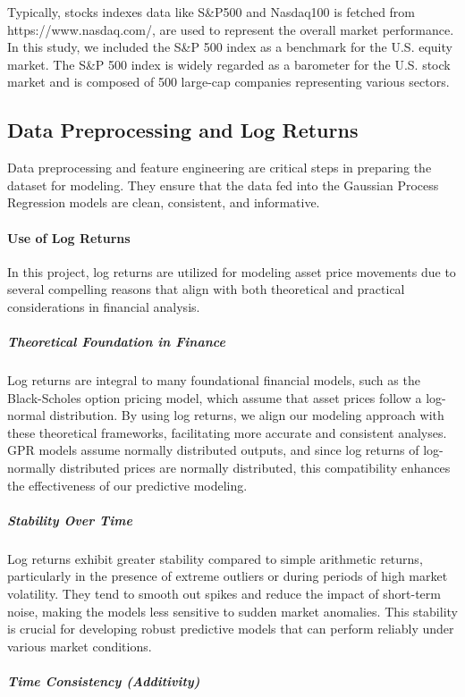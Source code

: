 Typically, stocks indexes data like S\&P500 and Nasdaq100 is fetched from https://www.nasdaq.com/, are used to represent the overall market performance. In this study, we included the S\&P 500 index as a benchmark for the U.S. equity market. The S\&P 500 index is widely regarded as a barometer for the U.S. stock market and is composed of 500 large-cap companies representing various sectors.

\subsection{Data Preprocessing and Log Returns}
Data preprocessing and feature engineering are critical steps in preparing the dataset for modeling. They ensure that the data fed into the Gaussian Process Regression models are clean, consistent, and informative.

\paragraph{Use of Log Returns}

In this project, log returns are utilized for modeling asset price movements due to several compelling reasons that align with both theoretical and practical considerations in financial analysis.

\subparagraph{Theoretical Foundation in Finance}

Log returns are integral to many foundational financial models, such as the Black-Scholes option pricing model, which assume that asset prices follow a log-normal distribution. By using log returns, we align our modeling approach with these theoretical frameworks, facilitating more accurate and consistent analyses. \ac{GPR} models assume normally distributed outputs, and since log returns of log-normally distributed prices are normally distributed, this compatibility enhances the effectiveness of our predictive modeling.

\subparagraph{Stability Over Time}

Log returns exhibit greater stability compared to simple arithmetic returns, particularly in the presence of extreme outliers or during periods of high market volatility. They tend to smooth out spikes and reduce the impact of short-term noise, making the models less sensitive to sudden market anomalies. This stability is crucial for developing robust predictive models that can perform reliably under various market conditions.

\subparagraph{Time Consistency (Additivity)}

